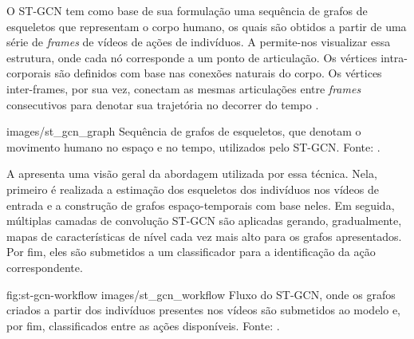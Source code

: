 
O ST-GCN tem como base de sua formulação uma sequência de grafos de esqueletos que representam o corpo humano, os quais são obtidos a partir de uma série de \textit{frames} de vídeos de ações de indivíduos. A  permite-nos visualizar essa estrutura, onde cada nó corresponde a um ponto de articulação. Os vértices intra-corporais são definidos com base nas conexões naturais do corpo. Os vértices inter-frames, por sua vez, conectam as mesmas articulações entre \textit{frames} consecutivos para denotar sua trajetória no decorrer do tempo \cite{st-gcn-2018}.

    {images/st_gcn_graph}
    {Sequência de grafos de esqueletos, que denotam o movimento humano no espaço e no tempo, utilizados pelo ST-GCN. Fonte: \cite[p. 1]{st-gcn-2018}.}

A  apresenta uma visão geral da abordagem utilizada por essa técnica. Nela, primeiro é realizada a estimação dos esqueletos dos indivíduos nos vídeos de entrada e a construção de grafos espaço-temporais com base neles. Em seguida, múltiplas camadas de convolução ST-GCN são aplicadas gerando, gradualmente, mapas de características de nível cada vez mais alto para os grafos apresentados. Por fim, eles são submetidos a um classificador para a identificação da ação correspondente.

\image
    {fig:st-gcn-workflow}
    {images/st_gcn_workflow}
    {Fluxo do ST-GCN, onde os grafos criados a partir dos indivíduos presentes nos vídeos são submetidos ao modelo e, por fim, classificados entre as ações disponíveis. Fonte: \cite[p. 3]{st-gcn-2018}.}



